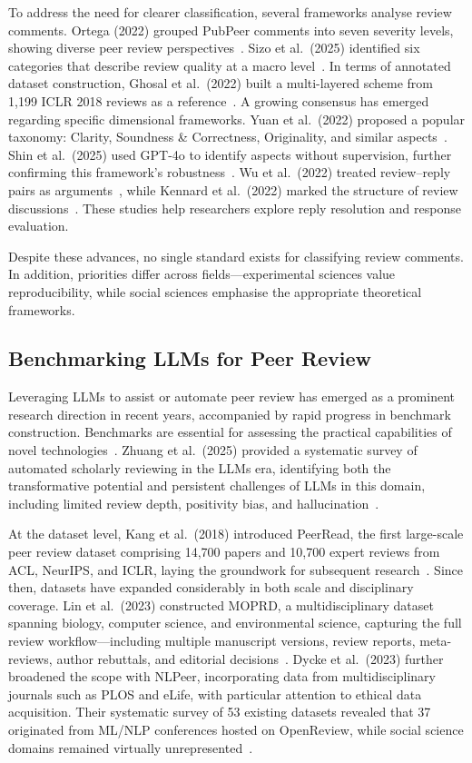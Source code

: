 \documentclass[preprint,10pt,times]{elsarticle}
\begin{document}
To address the need for clearer classification, several frameworks analyse review comments. Ortega (2022) grouped PubPeer comments into seven severity levels, showing diverse peer review perspectives~\cite{ref22}. Sizo et al.\ (2025) identified six categories that describe review quality at a macro level~\cite{ref23}. In terms of annotated dataset construction, Ghosal et al.\ (2022) built a multi-layered scheme from 1,199 ICLR 2018 reviews as a reference~\cite{ref24}. A growing consensus has emerged regarding specific dimensional frameworks. Yuan et al.\ (2022) proposed a popular taxonomy: Clarity, Soundness \& Correctness, Originality, and similar aspects~\cite{ref25}. Shin et al.\ (2025) used GPT-4o to identify aspects without supervision, further confirming this framework's robustness~\cite{ref26}. Wu et al.\ (2022) treated review--reply pairs as arguments~\cite{ref27}, while Kennard et al.\ (2022) marked the structure of review discussions~\cite{ref28}. These studies help researchers explore reply resolution and response evaluation.

Despite these advances, no single standard exists for classifying review comments. In addition, priorities differ across fields---experimental sciences value reproducibility, while social sciences emphasise the appropriate theoretical frameworks.

\subsection{Benchmarking LLMs for Peer Review}
\label{sec:benchmarking}

Leveraging LLMs to assist or automate peer review has emerged as a prominent research direction in recent years, accompanied by rapid progress in benchmark construction. Benchmarks are essential for assessing the practical capabilities of novel technologies~\cite{ref29}. Zhuang et al.\ (2025) provided a systematic survey of automated scholarly reviewing in the LLMs era, identifying both the transformative potential and persistent challenges of LLMs in this domain, including limited review depth, positivity bias, and hallucination~\cite{ref6}.

At the dataset level, Kang et al.\ (2018) introduced PeerRead, the first large-scale peer review dataset comprising 14,700 papers and 10,700 expert reviews from ACL, NeurIPS, and ICLR, laying the groundwork for subsequent research~\cite{ref7}. Since then, datasets have expanded considerably in both scale and disciplinary coverage. Lin et al.\ (2023) constructed MOPRD, a multidisciplinary dataset spanning biology, computer science, and environmental science, capturing the full review workflow---including multiple manuscript versions, review reports, meta-reviews, author rebuttals, and editorial decisions~\cite{ref30}. Dycke et al.\ (2023) further broadened the scope with NLPeer, incorporating data from multidisciplinary journals such as PLOS and eLife, with particular attention to ethical data acquisition. Their systematic survey of 53 existing datasets revealed that 37 originated from ML/NLP conferences hosted on OpenReview, while social science domains remained virtually unrepresented~\cite{ref31}.
\end{document}

